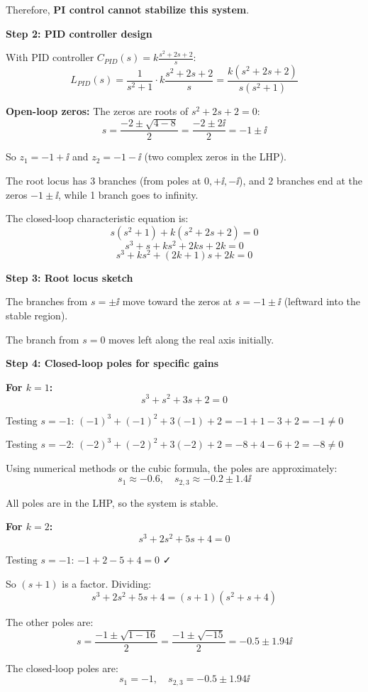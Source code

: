 \documentclass[11pt,a4paper]{article}
\begin{document}
Therefore, \textbf{PI control cannot stabilize this system}.

\textbf{Step 2: PID controller design}

With PID controller $C_{PID}(s) = k\frac{s^2 + 2s + 2}{s}$:
\[
L_{PID}(s) = \frac{1}{s^2 + 1} \cdot k\frac{s^2 + 2s + 2}{s} = \frac{k(s^2 + 2s + 2)}{s(s^2+1)}
\]

\textbf{Open-loop zeros:} The zeros are roots of $s^2 + 2s + 2 = 0$:
\[
s = \frac{-2 \pm \sqrt{4 - 8}}{2} = \frac{-2 \pm 2\ii}{2} = -1 \pm \ii
\]

So $z_1 = -1 + \ii$ and $z_2 = -1 - \ii$ (two complex zeros in the LHP).

The root locus has 3 branches (from poles at $0, +\ii, -\ii$), and 2 branches end at the zeros $-1 \pm \ii$, while 1 branch goes to infinity.

The closed-loop characteristic equation is:
\[
s(s^2+1) + k(s^2 + 2s + 2) = 0
\]
\[
s^3 + s + ks^2 + 2ks + 2k = 0
\]
\[
s^3 + ks^2 + (2k+1)s + 2k = 0
\]

\textbf{Step 3: Root locus sketch}

The branches from $s = \pm \ii$ move toward the zeros at $s = -1 \pm \ii$ (leftward into the stable region).

The branch from $s = 0$ moves left along the real axis initially.

\textbf{Step 4: Closed-loop poles for specific gains}

\textbf{For $k = 1$:}
\[
s^3 + s^2 + 3s + 2 = 0
\]

Testing $s = -1$: $(-1)^3 + (-1)^2 + 3(-1) + 2 = -1 + 1 - 3 + 2 = -1 \neq 0$

Testing $s = -2$: $(-2)^3 + (-2)^2 + 3(-2) + 2 = -8 + 4 - 6 + 2 = -8 \neq 0$

Using numerical methods or the cubic formula, the poles are approximately:
\[
s_1 \approx -0.6, \quad s_{2,3} \approx -0.2 \pm 1.4\ii
\]

All poles are in the LHP, so the system is stable.

\textbf{For $k = 2$:}
\[
s^3 + 2s^2 + 5s + 4 = 0
\]

Testing $s = -1$: $-1 + 2 - 5 + 4 = 0$ ✓

So $(s + 1)$ is a factor. Dividing:
\[
s^3 + 2s^2 + 5s + 4 = (s+1)(s^2 + s + 4)
\]

The other poles are:
\[
s = \frac{-1 \pm \sqrt{1 - 16}}{2} = \frac{-1 \pm \sqrt{-15}}{2} = -0.5 \pm 1.94\ii
\]

The closed-loop poles are:
\[
s_1 = -1, \quad s_{2,3} = -0.5 \pm 1.94\ii
\]
\end{document}
